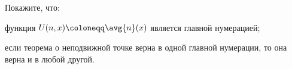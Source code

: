 Покажите, что:
\begin{enumcyr}
    \item функция $U(n, x) \coloneqq \avg{n}(x)$ является главной нумерацией;
    \item если теорема о неподвижной точке верна в одной главной нумерации, то она верна и в любой
        другой.
\end{enumcyr}